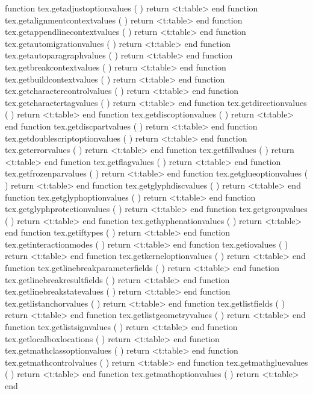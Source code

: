 \starttyping[option=LUA]
function tex.getadjustoptionvalues        ( ) return <t:table> end
function tex.getalignmentcontextvalues    ( ) return <t:table> end
function tex.getappendlinecontextvalues   ( ) return <t:table> end
function tex.getautomigrationvalues       ( ) return <t:table> end
function tex.getautoparagraphvalues       ( ) return <t:table> end
function tex.getbreakcontextvalues        ( ) return <t:table> end
function tex.getbuildcontextvalues        ( ) return <t:table> end
function tex.getcharactercontrolvalues    ( ) return <t:table> end
function tex.getcharactertagvalues        ( ) return <t:table> end
function tex.getdirectionvalues           ( ) return <t:table> end
function tex.getdiscoptionvalues          ( ) return <t:table> end
function tex.getdiscpartvalues            ( ) return <t:table> end
function tex.getdoublescriptoptionvalues  ( ) return <t:table> end
function tex.geterrorvalues               ( ) return <t:table> end
function tex.getfillvalues                ( ) return <t:table> end
function tex.getflagvalues                ( ) return <t:table> end
function tex.getfrozenparvalues           ( ) return <t:table> end
function tex.getglueoptionvalues          ( ) return <t:table> end
function tex.getglyphdiscvalues           ( ) return <t:table> end
function tex.getglyphoptionvalues         ( ) return <t:table> end
function tex.getglyphprotectionvalues     ( ) return <t:table> end
function tex.getgroupvalues               ( ) return <t:table> end
function tex.gethyphenationvalues         ( ) return <t:table> end
function tex.getiftypes                   ( ) return <t:table> end
function tex.getinteractionmodes          ( ) return <t:table> end
function tex.getiovalues                  ( ) return <t:table> end
function tex.getkerneloptionvalues        ( ) return <t:table> end
function tex.getlinebreakparameterfields  ( ) return <t:table> end
function tex.getlinebreakresultfields     ( ) return <t:table> end
function tex.getlinebreakstatevalues      ( ) return <t:table> end
function tex.getlistanchorvalues          ( ) return <t:table> end
function tex.getlistfields                ( ) return <t:table> end
function tex.getlistgeometryvalues        ( ) return <t:table> end
function tex.getlistsignvalues            ( ) return <t:table> end
function tex.getlocalboxlocations         ( ) return <t:table> end
function tex.getmathclassoptionvalues     ( ) return <t:table> end
function tex.getmathcontrolvalues         ( ) return <t:table> end
function tex.getmathgluevalues            ( ) return <t:table> end
function tex.getmathoptionvalues          ( ) return <t:table> end
